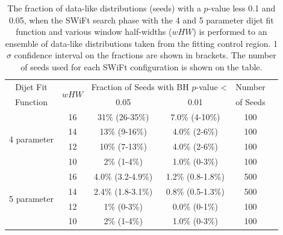 \begin{table}[!b]
\centering
\begin{tabular}{|c|c||c|c|c|c|}
  \hline
   Dijet Fit  & \multirow{2}{*}{$wHW$} &\multicolumn{2}{c|}{Fraction of Seeds with BH \mbox{$p$-value} \textless} &   Number   \\ \cline{3-4} 
   Function   &                        & 0.05                & 0.01                                               &  of Seeds  \\ 
  \hline
  \multirow{4}{*}{4 parameter} &   16 &  31\%   (26-35\%)   &  7.0\% (4-10\%)  & 100  \\
   &   14 &  13\%   (9-16\%)    &  4.0\% (2-6\%)   & 100  \\
   &   12 &  10\%   (7-13\%)    &  4.0\% (2-6\%)   & 100  \\
   &   10 &  2\%   (1-4\%)      &  1.0\% (0-3\%)   & 100  \\
  \hline
  \multirow{4}{*}{5 parameter} &   16 &  4.0\% (3.2-4.9\%)  &  1.2\% (0.8-1.8\%) & 500  \\
  &   14 &  2.4\% (1.8-3.1\%)  &  0.8\% (0.5-1.3\%) & 500  \\
  &   12 &  1\%   (0-3\%)      &  0.0\%  (0-1\%)  & 100  \\
  &   10 &  2\%   (1-4\%)      &  1.0\%  (0-3\%)  & 100  \\
  \hline
\end{tabular}

\caption[ The fraction of data-like distributions (seeds) 
  with a \bh{} \mbox{$p$-value} less 0.1 and 0.05,
  for the SWiFt search phase performed to an ensemble of data-like distributions
  taken from the \lm{} fitting control region.]
        {\label{tab:bumpH_lm_spuriousSignal}
  The fraction of data-like distributions (seeds) 
  with a \bh{} \mbox{$p$-value} less 0.1 and 0.05,
  when the SWiFt search phase with the 4 and 5 parameter dijet fit function
  and various window half-widths ($wHW$) is performed to an ensemble of data-like distributions
  taken from the \lm{} fitting control region.
  1$\sigma$ confidence interval on the fractions are shown in brackets.
  The number of seeds used for each SWiFt configuration is shown on the table.}
\end{table}

